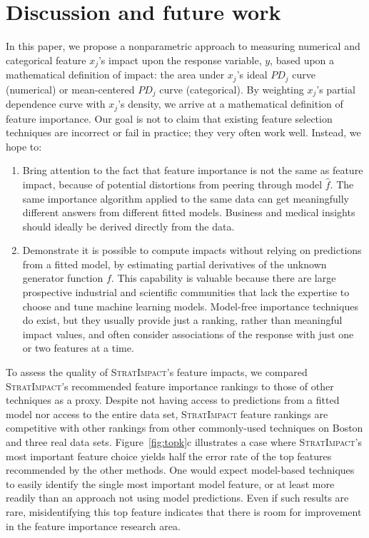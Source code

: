 \documentclass[11pt]{article}
\newcommand{\figref}[1]{Figure~\ref{#1}}
\newcommand{\simp}{\fontfamily{cmr}\textsc{\small StratImpact}}
\begin{document}
\section{Discussion and future work}\label{sec:discussion}

In this paper, we propose a nonparametric approach to measuring numerical and categorical feature $x_j$'s impact upon the response variable, $y$, based upon a mathematical definition of impact: the area under $x_j$'s ideal $PD_j$ curve (numerical) or mean-centered $PD_j$ curve (categorical). By weighting $x_j$'s  partial dependence curve with $x_j$'s density, we arrive at a mathematical definition of feature importance.  Our goal is not to claim that existing feature selection techniques are incorrect or fail in practice; they very often work well. Instead, we hope to:

\begin{enumerate}
\item Bring attention to the fact that feature importance is not the same as feature impact, because of potential distortions from peering through model $\hat{f}$. The same importance algorithm applied to the same data can get meaningfully different answers from different fitted models. Business and medical insights should ideally be derived directly from the data.

\item Demonstrate it is possible to compute impacts without relying on predictions from a fitted model, by estimating partial derivatives of the unknown generator function $f$. This capability is valuable because there are large prospective industrial and scientific communities that lack the expertise to choose and tune machine learning models. Model-free importance techniques do exist, but they usually provide just a ranking, rather than meaningful impact values, and often consider associations of the response with just one or two features at a time.
\end{enumerate}
 
To assess the quality of \simp's feature impacts, we compared \simp's recommended feature importance rankings to those of other techniques as a proxy. Despite not having access to predictions from a fitted model nor access to the entire data set, \simp{} feature rankings are competitive with other rankings from other commonly-used techniques on Boston and three real data sets.  \figref{fig:topk}c illustrates a case where \simp's most important feature choice yields half the error rate of the top features recommended by the other methods.  One would expect model-based techniques to easily identify the single most important model feature, or at least more readily than an approach not using model predictions.  Even if such results are rare, misidentifying this top feature indicates that there is room for improvement in the feature importance research area. 
\end{document}
